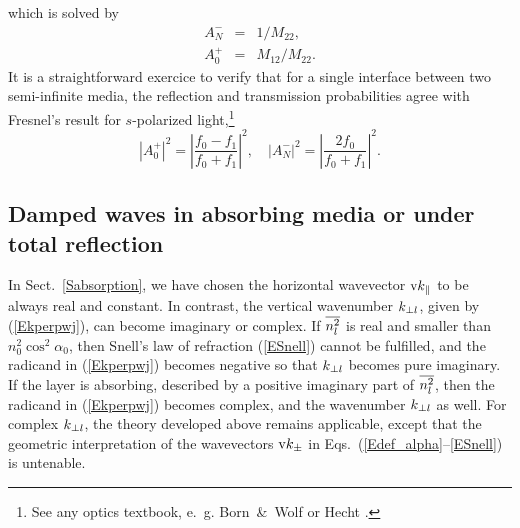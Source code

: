 which is solved by
\begin{equation}
  \begin{array}{lcl}
    A^-_N &=& 1/M_{22},\\[.2ex]
    A^+_0 &=& M_{12}/M_{22}.
  \end{array}
\end{equation}
It is a straightforward exercice to verify
that for a single interface between two semi-infinite media,
the reflection and transmission probabilities
agree with Fresnel's result for $s$-polarized light,\footnote
{See any optics textbook, e.~g. Born~\&~Wolf \cite[ch.~1.5.2]{BoWo99}
  or Hecht \cite[ch.~4.6.2]{Hec02}.}
\begin{equation}
  \left| A^+_0\right|^2
  = \left|\frac{f_0-f_1}{f_0+f_1}\right|^2,
  \quad
  \left| A^-_N\right|^2
  = \left| \frac{2f_0}{f_0+f_1}\right|^2.
\end{equation}


\subsection{Damped waves in absorbing media or under total reflection}
  \label{Smulayabs}

In Sect.~\ref{Sabsorption},
we have chosen the horizontal wavevector $\text{v}{k}_{\parallel}$
to be always real and constant.
In contrast, the vertical wavenumber $k_{\perp l}$,
given by (\ref{Ekperpwj}),
can become imaginary or complex.
If $\overline{n_l^2}$ is real and smaller than~$n_0^2\cos^2\alpha_0$,
then Snell's law of refraction (\ref{ESnell}) cannot be fulfilled,
and the radicand in (\ref{Ekperpwj}) becomes negative
so that $k_{\perp l}$ becomes pure imaginary.
%
If the layer is absorbing,
described by a positive imaginary part of $\overline{n_l^2}$,
then the radicand in (\ref{Ekperpwj}) becomes complex,
and the wavenumber $k_{\perp l}$ as well.
For complex $k_{\perp l}$,
the theory developed above remains applicable,
except that the geometric interpretation of the wavevectors $\text{v}{k}_\pm$
in Eqs.~(\ref{Edef_alpha}--\ref{ESnell}) is untenable.

